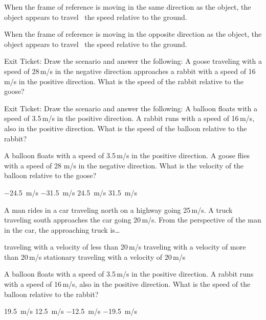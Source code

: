 \documentclass[]{exam}
\begin{document}
\begin{questions}
\question
When the frame of reference is moving in the same direction as the object, the object appears to travel \ the speed relative to the ground.

\question
When the frame of reference is moving in the opposite direction as the object, the object appears to travel \ the speed relative to the ground.

\question
Exit Ticket: Draw the scenario and answer the following: A goose traveling with a speed of 28\,m/s in the negative direction approaches a rabbit with a speed of 16\,m/s in the positive direction. What is the speed of the rabbit relative to the goose?

\question
Exit Ticket:  Draw the scenario and answer the following: A balloon floats with a speed of 3.5\,m/s in the positive direction.  A rabbit runs with a speed of 16\,m/s, also in the positive direction.  What is the speed of the balloon relative to the rabbit?


\question
A balloon floats with a speed of 3.5\,m/s in the positive direction.  A goose flies with a speed of 28 m/s in the negative direction. What is the velocity of the balloon relative to the goose?

\begin{randomizechoices}
    \choice \SI{-24.5}{m/s}
    \choice \SI{-31.5}{m/s}
    \choice \SI{24.5}{m/s}
    \correctchoice \SI{31.5}{m/s}
\end{randomizechoices}

\question
A man rides in a car traveling north on a highway going 25\,m/s. A truck traveling south approaches the car going 20\,m/s. From the perspective of the man in the car, the approaching truck is\dots

\begin{randomizechoices}
    \choice traveling with a velocity of less than 20\,m/s
    \choice traveling with a velocity of more than 20\,m/s
    \choice stationary
    \choice traveling with a velocity of 20\,m/s
\end{randomizechoices}

\question
A balloon floats with a speed of 3.5\,m/s in the positive direction. A rabbit runs with a speed of 16\,m/s, also in the positive direction. What is the speed of the balloon relative to the rabbit?

\begin{randomizechoices}
    \choice \SI{19.5}{m/s}
    \choice \SI{12.5}{m/s}
    \correctchoice \SI{-12.5}{m/s}
    \choice \SI{-19.5}{m/s}
\end{randomizechoices}


\end{questions}
\end{document}
